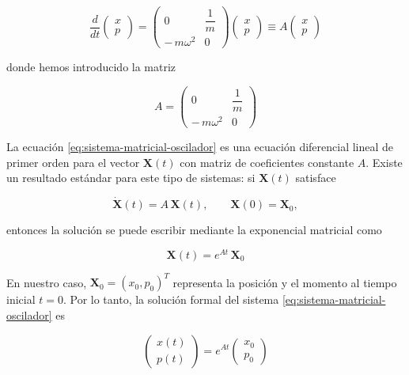 \documentclass{article}
\begin{document}
\begin{equation}
\frac{d}{dt}
\begin{pmatrix}
x \\[4pt]
p
\end{pmatrix}
=
\begin{pmatrix}
0 & \dfrac{1}{m} \\[6pt]
-\,m\omega^{2} & 0
\end{pmatrix}
\begin{pmatrix}
x \\[4pt]
p
\end{pmatrix}
\equiv
A
\begin{pmatrix}
x \\[4pt]
p
\end{pmatrix}
\label{eq:sistema-matricial-oscilador}
\end{equation}

donde hemos introducido la matriz

\begin{equation}
A =
\begin{pmatrix}
0 & \dfrac{1}{m} \\[6pt]
-\,m\omega^{2} & 0
\end{pmatrix}
\label{eq:matriz-A-oscilador}
\end{equation}

La ecuación \eqref{eq:sistema-matricial-oscilador} es una ecuación diferencial
lineal de primer orden para el vector $\mathbf{X}(t)$ con matriz de coeficientes
constante $A$. Existe un resultado estándar para este tipo de sistemas: si
$\mathbf{X}(t)$ satisface

\[
\dot{\mathbf{X}}(t) = A\,\mathbf{X}(t),
\qquad
\mathbf{X}(0) = \mathbf{X}_{0},
\]

entonces la solución se puede escribir mediante la exponencial matricial como

\[
\mathbf{X}(t) = e^{At}\,\mathbf{X}_{0}
\]

En nuestro caso, $\mathbf{X}_{0} = (x_{0},p_{0})^{T}$ representa la posición y
el momento al tiempo inicial $t=0$. Por lo tanto, la solución formal del sistema
\eqref{eq:sistema-matricial-oscilador} es

\begin{equation}
\begin{pmatrix}
x(t) \\[4pt]
p(t)
\end{pmatrix}
=
e^{At}
\begin{pmatrix}
x_{0} \\[4pt]
p_{0}
\end{pmatrix}
\label{eq:solucion-matricial-formal}
\end{equation}
\end{document}
